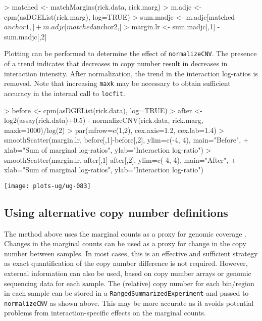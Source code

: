 \documentclass[12pt]{report}
\renewenvironment{Schunk}{\vspace{0pt}}{\vspace{0pt}}
\newcommand{\code}[1]{{\small\texttt{#1}}}
\begin{document}
\begin{Schunk}
\begin{Sinput}
> matched <- matchMargins(rick.data, rick.marg)
> m.adjc <- cpm(asDGEList(rick.marg), log=TRUE)
> sum.madjc <- m.adjc[matched$anchor1,] + m.adjc[matched$anchor2,]
> margin.lr <- sum.madjc[,1] - sum.madjc[,2]
\end{Sinput}
\end{Schunk}

Plotting can be performed to determine the effect of \code{normalizeCNV}.
The presence of a trend indicates that decreases in copy number result in decreases in interaction intensity.
After normalization, the trend in the interaction log-ratios is removed.
Note that increasing \code{maxk} may be necessary to obtain sufficient accuracy in the internal call to \code{locfit}.

\begin{Schunk}
\begin{Sinput}
> before <- cpm(asDGEList(rick.data), log=TRUE)
> after <- log2(assay(rick.data)+0.5) - normalizeCNV(rick.data, rick.marg, maxk=1000)/log(2)
> par(mfrow=c(1,2), cex.axis=1.2, cex.lab=1.4)
> smoothScatter(margin.lr, before[,1]-before[,2], ylim=c(-4, 4), main="Before",
+     xlab="Sum of marginal log-ratios", ylab="Interaction log-ratio")
> smoothScatter(margin.lr, after[,1]-after[,2], ylim=c(-4, 4), main="After",
+     xlab="Sum of marginal log-ratios", ylab="Interaction log-ratio")
\end{Sinput}
\end{Schunk}

\begin{center}
\texttt{[image: plots-ug/ug-083]}
\end{center}

\subsection{Using alternative copy number definitions}
The method above uses the marginal counts as a proxy for genomic coverage \cite{imakaev2012iterative}.
Changes in the marginal counts can be used as a proxy for change in the copy number between samples.     
In most cases, this is an effective and sufficient strategy as exact quantification of the copy number difference is not required.
However, external information can also be used, based on copy number arrays or genomic sequencing data for each sample.
The (relative) copy number for each bin/region in each sample can be stored in a \code{RangedSummarizedExperiment} and passed to \code{normalizeCNV} as shown above.
This may be more accurate as it avoids potential problems from interaction-specific effects on the marginal counts.
\end{document}
